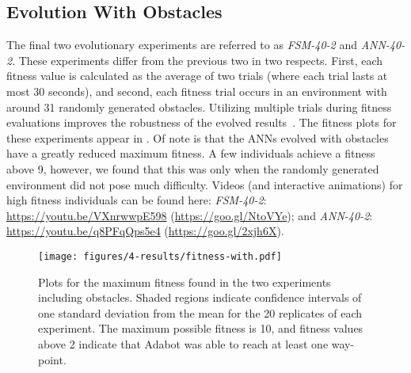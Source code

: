 \subsection{Evolution With Obstacles}



The final two evolutionary experiments are referred to as \emph{FSM-40-2} and \emph{ANN-40-2}.
%
These experiments differ from the previous two in two respects. First, each fitness value is calculated as the average of two trials (where each trial lasts at most 30 seconds), and second, each fitness trial occurs in an environment with around 31 randomly generated obstacles.
%
Utilizing multiple trials during fitness evaluations improves the robustness of the evolved results~\citep{Ruud.SSCI.EvoLearn.2016}.
%
The fitness plots for these experiments appear in .
%
Of note is that the ANNs evolved with obstacles have a greatly reduced maximum fitness. A few individuals achieve a fitness above 9, however, we found that this was only when the randomly generated environment did not pose much difficulty.
%
Videos (and interactive animations) for high fitness individuals can be found here: \emph{FSM-40-2}: \url{https://youtu.be/VXnrwwpE598} (\url{https://goo.gl/NtoVYe}); and \emph{ANN-40-2}: \url{https://youtu.be/q8PFqQps5e4} (\url{https://goo.gl/2xjh6X}).
%


\begin{figure}[!ht]
    \centering

    \texttt{[image: figures/4-results/fitness-with.pdf]}

    \caption{Plots for the maximum fitness found in the two experiments including obstacles. Shaded regions indicate confidence intervals of one standard deviation from the mean for the 20 replicates of each experiment. The maximum possible fitness is 10, and fitness values above 2 indicate that Adabot was able to reach at least one way-point.}
    \label{fig:fitness-vs-iteration-obst}

\end{figure}


